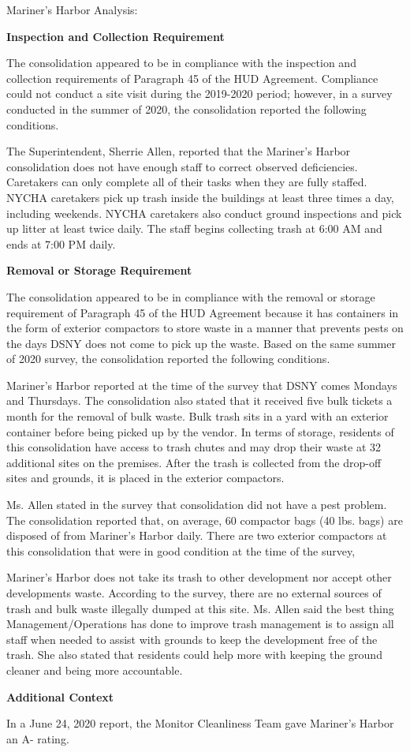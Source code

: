 Mariner's Harbor Analysis: 

\textbf{Inspection and Collection Requirement} 

 

The consolidation appeared to be in compliance with the inspection and collection requirements of Paragraph 45 of the HUD Agreement. Compliance could not conduct a site visit during the 2019-2020 period; however, in a survey conducted in the summer of 2020, the consolidation reported the following conditions.

The Superintendent, Sherrie Allen, reported that the Mariner's Harbor consolidation does not have enough staff to correct observed deficiencies. Caretakers can only complete all of their tasks when they are fully staffed. NYCHA caretakers pick up trash inside the buildings at least three times a day, including weekends. NYCHA caretakers also conduct ground inspections and pick up litter at least twice daily. The staff begins collecting trash at 6:00 AM and ends at 7:00 PM daily.

\textbf{Removal or Storage Requirement} 

The consolidation appeared to be in compliance with the removal or storage requirement of Paragraph  45 of the HUD Agreement because it has containers in the form of exterior compactors to store waste in a manner that prevents pests on the days DSNY does not come to pick up the waste. Based on the same summer of  2020  survey, the consolidation reported the following conditions.

  

Mariner's Harbor reported at the time of the survey that DSNY comes Mondays and Thursdays. The consolidation also stated that it received five bulk tickets a month for the removal of bulk waste. Bulk trash sits in a yard with an exterior container before being picked up by the vendor. In terms of storage, residents of this consolidation have access to trash chutes and may drop their waste at 32 additional sites on the premises. After the trash is collected from the drop-off sites and grounds, it is placed in the exterior compactors. 

 

Ms. Allen stated in the survey that consolidation did not have a pest problem. The consolidation reported that, on average, 60 compactor bags (40 lbs. bags)  are disposed of from Mariner's Harbor daily. There are two exterior compactors at this consolidation that were in good condition at the time of the survey, 

Mariner's Harbor does not take its trash to other development nor accept other developments waste. According to the survey, there are no external sources of trash and bulk waste illegally dumped at this site. Ms. Allen said the best thing Management/Operations has done to improve trash management is to assign all staff when needed to assist with grounds to keep the development free of the trash. She also stated that residents could help more with keeping the ground cleaner and being more accountable. 


\textbf{Additional Context}  

In a June 24, 2020 report, the Monitor Cleanliness Team gave Mariner's Harbor an A- rating.  

 